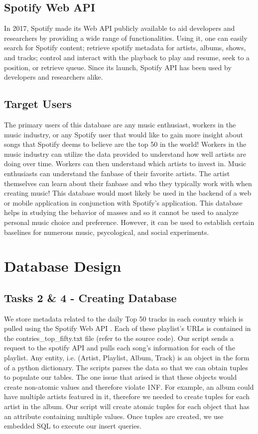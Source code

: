 \documentclass[conference]{IEEEtran}
\begin{document}
\subsection{Spotify Web API \cite{b1}}
In 2017, Spotify made its Web API publicly available to aid developers and researchers by providing a wide range of functionalities. Using it, one can easily search for Spotify content; retrieve spotify metadata for artists, albums, shows, and tracks; control and interact with the playback to play and resume, seek to a position, or retrieve queue. Since its launch, Spotify API has been used by developers and researchers alike. 

\subsection{Target Users}
The primary users of this database are any music enthusiast, workers in the music industry, or any Spotify user that would like to gain more insight about songs that Spotify deems to believe are the top 50 in the world! Workers in the music industry can utilize the data provided to understand how well artists are doing over time. Workers can then understand which artists to invest in. Music enthusiasts can understand the fanbase of their favorite artists. The artist themselves can learn about their fanbase and who they typically work with when creating music! This database would most likely be used in the backend of a web or mobile application in conjunction with Spotify’s application. \linebreak This database helps in studying the behavior of masses and so it cannot be used to analyze personal music choice and preference. However, it can be used to establish certain baselines for numerous music, psycological, and social experiments. \ 

\section{Database Design}

\subsection{\textbf{Tasks 2 \& 4} - Creating Database}
We store metadata related to the daily Top 50 tracks in each country which is pulled using the Spotify Web API \cite{b1}. Each of these playlist's URLs is contained in the contries\_top\_fifty.txt file (refer to the source code). Our script sends a request to the spotify API and pulls each song's information for each of the playlist. Any entity, i.e. (Artist, Playlist, Album, Track) is an object in the form of a python dictionary. The scripts parses the data so that we can obtain tuples to populate our tables. The one issue that arised is that these objects would create non-atomic values and therefore violate 1NF. For example, an album could have multiple artists featured in it, therefore we needed to create tuples for each artist in the album.  Our script will create atomic tuples for each object that has an attribute containing multiple values. Once tuples are created, we use embedded SQL to execute our insert queries.
\end{document}
